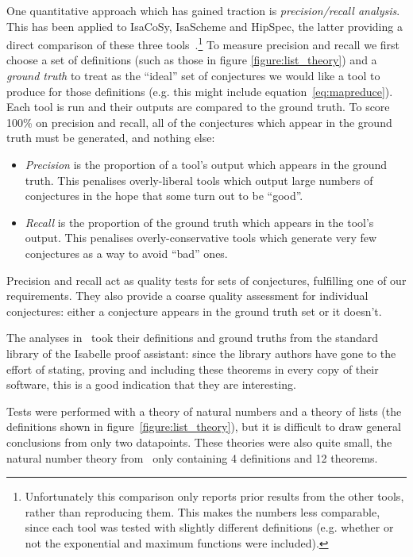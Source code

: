 One quantitative approach which has gained traction is \emph{precision/recall
  analysis}. This has been applied to IsaCoSy, IsaScheme and HipSpec, the latter
providing a direct comparison of these three
tools~\cite{claessen2013automating}.\footnote{Unfortunately this comparison only
  reports prior results from the other tools, rather than reproducing them.
  This makes the numbers less comparable, since each tool was tested with
  slightly different definitions (e.g. whether or not the exponential and
  maximum functions were included).} To measure precision and recall we first
choose a set of definitions (such as those in figure \ref{figure:list_theory})
and a \emph{ground truth} to treat as the ``ideal'' set of conjectures we would
like a tool to produce for those definitions (e.g. this might include
equation~\ref{eq:mapreduce}). Each tool is run and their outputs are compared to
the ground truth. To score 100\% on precision and recall, all of the conjectures
which appear in the ground truth must be generated, and nothing else:

\begin{itemize}
\item \emph{Precision} is the proportion of a tool's output which appears in
  the ground truth. This penalises overly-liberal tools which output large
  numbers of conjectures in the hope that some turn out to be ``good''.
\item \emph{Recall} is the proportion of the ground truth which appears in the
  tool's output. This penalises overly-conservative tools which generate very
  few conjectures as a way to avoid ``bad'' ones.
\end{itemize}

Precision and recall act as quality tests for sets of conjectures, fulfilling
one of our requirements. They also provide a coarse quality assessment for
individual conjectures: either a conjecture appears in the ground truth set or
it doesn't.

The analyses in~\cite{claessen2013automating} took their definitions and ground
truths from the standard library of the Isabelle proof assistant: since the
library authors have gone to the effort of stating, proving and including these
theorems in every copy of their software, this is a good indication that they
are interesting.

Tests were performed with a theory of natural numbers and a theory of lists (the
definitions shown in figure~\ref{figure:list_theory}), %
but it is difficult to
draw general conclusions from only two datapoints. These theories were also
quite small, the natural number theory
from~\cite{Johansson.Dixon.Bundy:conjecture-generation} only containing 4
definitions and 12 theorems.

